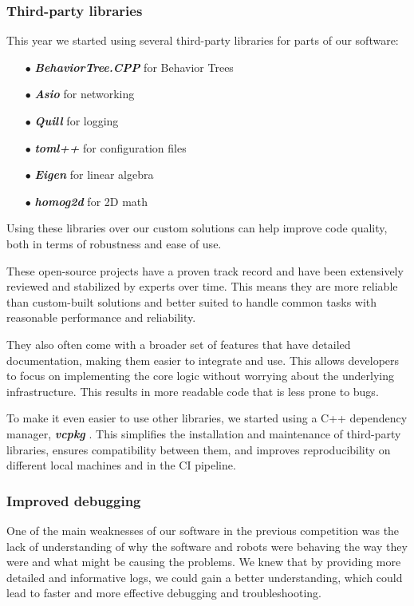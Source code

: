 \documentclass[runningheads]{llncs}
\begin{document}
\subsubsection{Third-party libraries}
This year we started using several third-party libraries for parts of our software:
\begin{enumerate}
    \item[$\bullet$] \textbf{\textit{BehaviorTree.CPP}} \cite{ref_3rd-party_btcpp} for Behavior Trees
    \item[$\bullet$] \textbf{\textit{Asio}} \cite{ref_3rd-party_asio} for networking
    \item[$\bullet$] \textbf{\textit{Quill}} \cite{ref_3rd-party_quill} for logging
    \item[$\bullet$] \textbf{\textit{toml++}} \cite{ref_3rd-party_tomlplusplus} for configuration files
    \item[$\bullet$] \textbf{\textit{Eigen}} \cite{ref_3rd-party_eigen} for linear algebra
    \item[$\bullet$] \textbf{\textit{homog2d}} \cite{ref_3rd-party_homog2d} for 2D math
\end{enumerate}

\indent Using these libraries over our custom solutions can help improve code quality, both in terms of robustness and ease of use.

\indent These open-source projects have a proven track record and have been extensively reviewed and stabilized by experts over time. This means they are more reliable than custom-built solutions and better suited to handle common tasks with reasonable performance and reliability.

\indent They also often come with a broader set of features that have detailed documentation, making them easier to integrate and use. This allows developers to focus on implementing the core logic without worrying about the underlying infrastructure. This results in more readable code that is less prone to bugs.

\indent To make it even easier to use other libraries, we started using a C++ dependency manager, \textbf{\textit{vcpkg}} \cite{ref_3rd-party_vcpkg}. This simplifies the installation and maintenance of third-party libraries, ensures compatibility between them, and improves reproducibility on different local machines and in the CI pipeline.

\subsubsection{Improved debugging}
One of the main weaknesses of our software in the previous competition was the lack of understanding of why the software and robots were behaving the way they were and what might be causing the problems. We knew that by providing more detailed and informative logs, we could gain a better understanding, which could lead to faster and more effective debugging and troubleshooting.
\end{document}
